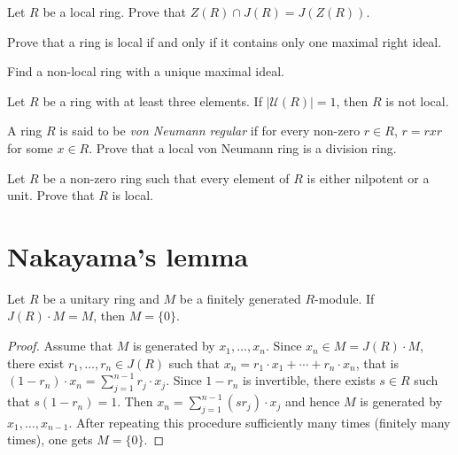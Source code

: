 \begin{exercise}
\label{eq:local_center}
    Let $R$ be a local ring. Prove that 
    $Z(R)\cap J(R)=J(Z(R))$.  
\end{exercise}

\begin{exercise}
\label{xca:local_right}
    Prove that a ring is local if and only if it contains only one maximal right ideal.
\end{exercise}

\begin{exercise}
\label{xca:non_local1}
    Find a non-local ring with a unique maximal ideal. 
\end{exercise}


\begin{exercise}
\label{xca:non_local2}
    Let $R$ be a ring with at least three elements. 
    If $|\mathcal{U}(R)|=1$, then $R$ is not local. 
\end{exercise}


\begin{exercise}
\label{xca:VonNeumann_local}
    A ring $R$ is said to be \emph{von Neumann regular} if  
    for every non-zero $r\in R$, $r=rxr$ for some $x\in R$. 
    Prove that a local von Neumann ring is a division ring. 
\end{exercise}

\begin{exercise}
\label{xca:nilp_or_unit}
    Let $R$ be a non-zero ring such that every element of $R$ is either 
    nilpotent or a unit. Prove that $R$ is local. 
\end{exercise}


\section{Nakayama's lemma}

\begin{lemma}[Nakayama]
	\label{lem:Nakayama}
	Let $R$ be a unitary ring and $M$ be 
    a finitely generated $R$-module. 
    If $J(R)\cdot M=M$, then $M=\{0\}$.
\end{lemma}

\begin{proof}
	Assume that $M$ is generated by 
    $x_1,\dots,x_n$. Since $x_n\in M=J(R)\cdot M$, 
	there exist $r_1,\dots,r_n\in J(R)$ such that  $x_n=r_1\cdot x_1+\cdots+r_n\cdot x_n$, that is 
	$(1-r_n)\cdot x_n=\sum_{j=1}^{n-1}r_j\cdot x_j$. 
	Since $1-r_n$ is invertible, there exists 
    $s\in R$ such that $s(1-r_n)=1$. Then
	$x_n=\sum_{j=1}^{n-1}(sr_j)\cdot x_j$ 
	and hence $M$ is generated by $x_1,\dots,x_{n-1}$. After repeating this procedure sufficiently many times (finitely many times), one gets $M=\{0\}$.
\end{proof}

